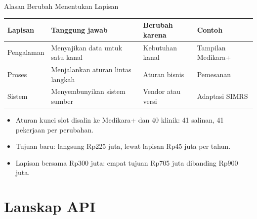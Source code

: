 \documentclass[aspectratio=169, table, 12pt]{beamer}
\begin{document}
\begin{frame}{{\Large Alasan Berubah Menentukan Lapisan}}
  \footnotesize
  \begin{tabularx}{\textwidth}{>{\raggedright\arraybackslash}p{2.0cm}
      >{\raggedright\arraybackslash}X >{\raggedright\arraybackslash}p{2.7cm} >{\raggedright\arraybackslash}p{2.9cm}}
    \hline
    \textbf{Lapisan} & \textbf{Tanggung jawab} & \textbf{Berubah karena} & \textbf{Contoh} \\ \hline
    Pengalaman & Menyajikan data untuk satu kanal & Kebutuhan kanal & Tampilan Medikara+ \\ \hline
    Proses & Menjalankan aturan lintas langkah & Aturan bisnis & Pemesanan \\ \hline
    Sistem & Menyembunyikan sistem sumber & Vendor atau versi & Adaptasi SIMRS \\ \hline
  \end{tabularx}

  \vspace{8pt}
  \begin{itemize}
    \small
    \item Aturan kunci slot disalin ke Medikara+ dan 40 klinik: 41 salinan, 41 pekerjaan per perubahan.
    \item Tujuan baru: langsung Rp225 juta, lewat lapisan Rp45 juta per tahun.
    \item Lapisan bersama Rp300 juta: empat tujuan Rp705 juta dibanding Rp900 juta.
  \end{itemize}
\end{frame}

\section{Lanskap API}
\end{document}
